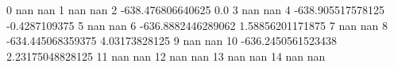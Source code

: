 0 nan nan
1 nan nan
2 -638.476806640625 0.0
3 nan nan
4 -638.905517578125 -0.4287109375
5 nan nan
6 -636.8882446289062 1.58856201171875
7 nan nan
8 -634.445068359375 4.03173828125
9 nan nan
10 -636.2450561523438 2.23175048828125
11 nan nan
12 nan nan
13 nan nan
14 nan nan
